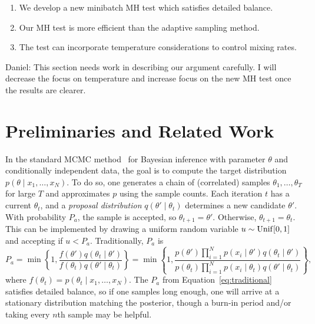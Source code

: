 \documentclass{article}
\begin{document}
\begin{enumerate}[noitemsep]
    \item We develop a new minibatch MH test which satisfies detailed balance.
    \item Our MH test is more efficient than the adaptive sampling method.
    \item The test can incorporate temperature considerations to control mixing rates.
\end{enumerate}

{\color{blue}
Daniel: This section needs work in describing our argument carefully. I will decrease the focus on
temperature and increase focus on the new MH test once the results are clearer.
}



\section{Preliminaries and Related Work}\label{sec:related_work}

In the standard MCMC method~\cite{gilks1996markov,brooks2011handbook} for Bayesian inference with
parameter $\theta$ and conditionally independent data, the goal is to compute the target
distribution $p(\theta \mid x_1, \ldots, x_N)$.  To do so, one generates a chain of (correlated)
samples $\theta_1, \ldots, \theta_T$ for large $T$ and approximates $p$ using the sample counts.
Each iteration $t$ has a current $\theta_t$, and a \emph{proposal distribution} $q(\theta' \mid
\theta_t)$ determines a new candidate $\theta'$. With probability $P_a$, the sample is accepted, so
$\theta_{t+1} = \theta'$. Otherwise, $\theta_{t+1} = \theta_t$. This can be implemented by drawing
a uniform random variable $u \sim {\rm Unif}[0,1]$ and accepting if $u < P_a$. Traditionally, $P_a$ is
\begin{equation}\label{eq:traditional}
P_a = \min\left\{ 1, \frac{f(\theta')q(\theta_t \mid \theta')}{f(\theta_t)q(\theta' \mid \theta_t)}
\right\} = \min\left\{ 1, \frac{p(\theta')\prod_{i=1}^N p(x_i \mid \theta')q(\theta_t \mid
\theta')}{p(\theta_t)\prod_{i=1}^N p(x_i \mid \theta_t)q(\theta' \mid
\theta_t)} \right\},
\end{equation}
where $f(\theta_t)=p(\theta_t \mid x_1,\ldots,x_N)$. The $P_a$ from Equation~\ref{eq:traditional}
satisfies detailed balance, so if one samples long enough, one will arrive at a stationary
distribution matching the posterior, though a burn-in period and/or taking every $n$th sample may be
helpful.
\end{document}
